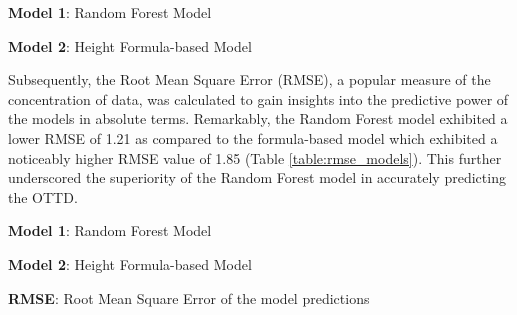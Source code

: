 \documentclass[11pt]{article}
\begin{document}
\begin{table}[h]
\caption{Test of difference in predictive power between formula-based model}
\label{table:prediction_models}
\begin{threeparttable}
\renewcommand{\TPTminimum}{\linewidth}
\begin{tablenotes}
\footnotesize
\item \textbf{Model 1}: Random Forest Model
\item \textbf{Model 2}: Height Formula-based Model
\end{tablenotes}
\end{threeparttable}
\end{table}


Subsequently, the Root Mean Square Error (RMSE), a popular measure of the concentration of data, was calculated to gain insights into the predictive power of the models in absolute terms. Remarkably, the Random Forest model exhibited a lower RMSE of 1.21 as compared to the formula-based model which exhibited a noticeably higher RMSE value of 1.85 (Table \ref{table:rmse_models}). This further underscored the superiority of the Random Forest model in accurately predicting the OTTD.

\begin{table}[h]
\caption{Root mean square error of formula-based model and the Random Forest model}
\label{table:rmse_models}
\begin{threeparttable}
\renewcommand{\TPTminimum}{\linewidth}
\begin{tablenotes}
\footnotesize
\item \textbf{Model 1}: Random Forest Model
\item \textbf{Model 2}: Height Formula-based Model
\item \textbf{RMSE}: Root Mean Square Error of the model predictions
\end{tablenotes}
\end{threeparttable}
\end{table}
\end{document}
